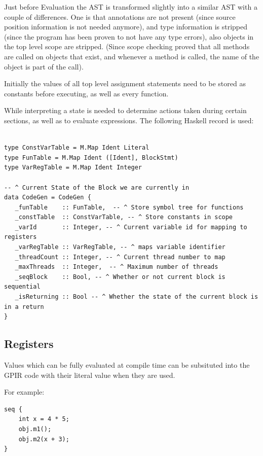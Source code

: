 Just before Evaluation the AST is transformed slightly into a similar AST
with a couple of differences. One is that annotations are not present (since source position information
is not needed anymore), and type information is stripped (since the program has been proven to 
not have any type errors), also objects in the top level scope are stripped. (Since scope checking
proved that all methods are called on objects that exist, and whenever a method is called, the
name of the object is part of the call).

Initially the values of all top level assignment statements need to be stored
as constants before executing, as well as every function.

While interpreting a state is needed to determine actions taken
during certain sections, as well as to evaluate expressions.
The following Haskell record is used:

\begin{lstlisting}[style=myHaskell]

type ConstVarTable = M.Map Ident Literal
type FunTable = M.Map Ident ([Ident], BlockStmt)
type VarRegTable = M.Map Ident Integer

-- ^ Current State of the Block we are currently in
data CodeGen = CodeGen {
   _funTable    :: FunTable,  -- ^ Store symbol tree for functions
   _constTable  :: ConstVarTable, -- ^ Store constants in scope
   _varId       :: Integer, -- ^ Current variable id for mapping to registers
   _varRegTable :: VarRegTable, -- ^ maps variable identifier
   _threadCount :: Integer, -- ^ Current thread number to map
   _maxThreads  :: Integer,  -- ^ Maximum number of threads
   _seqBlock    :: Bool, -- ^ Whether or not current block is sequential
   _isReturning :: Bool -- ^ Whether the state of the current block is in a return
}

\end{lstlisting}


\subsection{Registers}
Values which can be fully evaluated at compile time can be subsituted into the
GPIR code with their literal value when they are used.

For example:

\begin{lstlisting}[style=myGPC, frame=single]
seq {
    int x = 4 * 5;
    obj.m1();
    obj.m2(x + 3);
}
\end{lstlisting}

